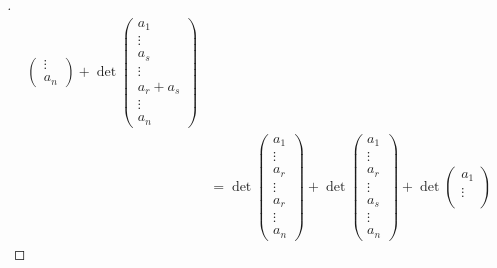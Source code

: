 \begin{proof}[]
\begin{align*}
\begin{pmatrix}
			                              \vdots    \\
			                              a_n
		                              \end{pmatrix} + \det\begin{pmatrix}
			                                                  a_1       \\
			                                                  \vdots    \\
			                                                  a_s       \\
			                                                  \vdots    \\
			                                                  a_r + a_s \\
			                                                  \vdots    \\
			                                                  a_n
		                                                  \end{pmatrix}                     \\
		  & = \det\begin{pmatrix}
			          a_1    \\
			          \vdots \\
			          a_r    \\
			          \vdots \\
			          a_r    \\
			          \vdots \\
			          a_n
		          \end{pmatrix} + \det\begin{pmatrix}
			                              a_1    \\
			                              \vdots \\
			                              a_r    \\
			                              \vdots \\
			                              a_s    \\
			                              \vdots \\
			                              a_n
		                              \end{pmatrix} + \det\begin{pmatrix}
			                                                  a_1    \\
			                                                  \vdots \\

\end{pmatrix}
\end{align*}
\end{proof}
